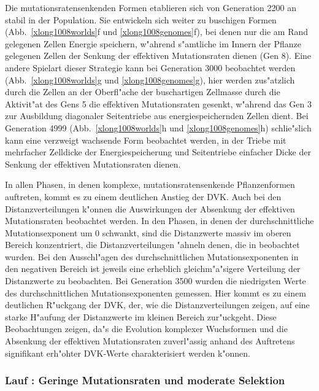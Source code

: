 Die mutationsratensenkenden Formen etablieren sich von Generation 2200 an stabil in der Population.
Sie entwickeln sich weiter zu buschigen Formen (Abb.\ \ref{xlong1008worlds}f und \ref{xlong1008genomes}f),
bei denen nur die am Rand gelegenen Zellen Energie speichern, w"ahrend s"amtliche im Innern der
Pflanze gelegenen Zellen der Senkung der effektiven Mutationsraten dienen (Gen 8). Eine andere
Spielart dieser Strategie kann bei Generation 3000 beobachtet werden (Abb.\ \ref{xlong1008worlds}g und \ref{xlong1008genomes}g),
hier werden zus"atzlich durch die Zellen an der Oberfl"ache der buschartigen Zellmasse durch die
Aktivit"at des Gens 5 die effektiven Mutationsraten gesenkt, w"ahrend das Gen 3 zur Ausbildung
diagonaler Seitentriebe aus energiespeichernden Zellen dient. Bei Generation 4999
(Abb.\ \ref{xlong1008worlds}h und \ref{xlong1008genomes}h) schlie"slich kann eine verzweigt wachsende
Form beobachtet werden, in der Triebe mit mehrfacher Zelldicke der Energiespeicherung und Seitentriebe
einfacher Dicke der Senkung der effektiven Mutationsraten dienen.

In allen Phasen, in denen komplexe, mutationsratensenkende Pflanzenformen auftreten, kommt
es zu einem deutlichen Anstieg der DVK. Auch bei den Distanzverteilungen k"onnen die
Auswirkungen der Absenkung der effektiven Mutationsraten beobachtet werden. In den Phasen,
in denen der durchschnittliche Mutationsexponent um 0 schwankt, sind die Distanzwerte massiv
im oberen Bereich konzentriert, die Distanzverteilungen "ahneln denen, die in 
beobachtet wurden. Bei den Ausschl"agen des durchschnittlichen Mutationsexponenten in den negativen
Bereich ist jeweils eine erheblich gleichm"a"sigere Verteilung der Distanzwerte zu beobachten.
Bei Generation 3500 wurden die niedrigsten Werte des durchschnittlichen Mutationsexponenten gemessen.
Hier kommt es zu einem deutlichen R"uckgang der DVK, der, wie die Distanzverteilungen zeigen,
auf eine starke H"aufung der Distanzwerte im kleinen Bereich zur"uckgeht. Diese Beobachtungen
zeigen, da"s die Evolution komplexer Wuchsformen und die Absenkung der effektiven Mutationsraten
zuverl"assig anhand des Auftretens signifikant erh"ohter DVK-Werte charakterisiert werden k"onnen.



\subsubsection{Lauf : Geringe Mutationsraten und moderate Selektion}
\label{xlong00105section}

